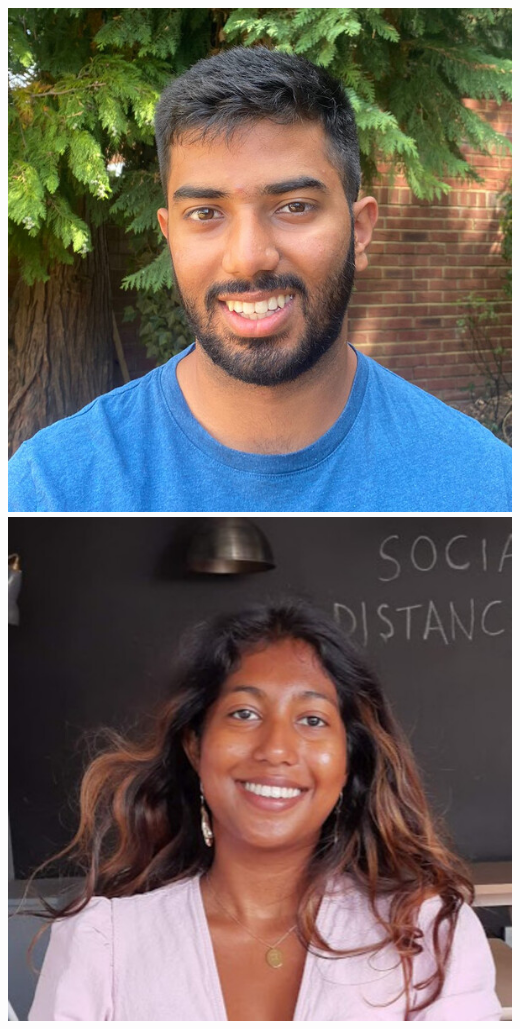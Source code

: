 \documentclass[aspectratio=169]{beamer}
\begin{document}
\begin{frame}
{        \includegraphics[width=0.09\textheight]{people/krish_nanavati.jpg}%
        \includegraphics[width=0.09\textheight]{people/metha_prathaban.jpg}%
}
\end{frame}
\end{document}
